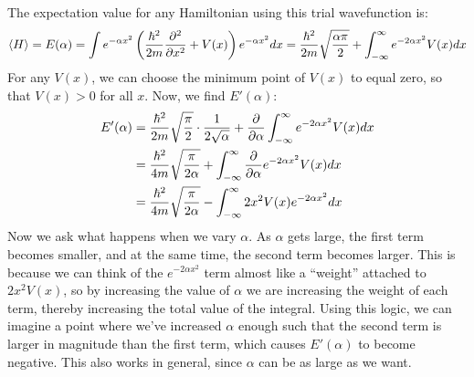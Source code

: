 \documentclass[10pt]{article}
\begin{document}
	\begin{solution}
		The expectation value for any Hamiltonian using this trial wavefunction is: 
		\[ \langle H \rangle = E(\alpha) = \int e^{-\alpha x^2}\left( \frac{\hbar^2}{2m}\pdv[2]{x} + V(x)\right) e^{-\alpha x^2} dx = \frac{\hbar^2}{2m}\sqrt{\frac{\alpha \pi}{2}} + \int_{-\infty}^\infty e^{-2\alpha x^2}V(x) dx\]
		For any $V(x)$, we can choose the minimum point of $V(x)$ to equal zero, so that $V(x) > 0$ for all $x$. Now, we find $E'(\alpha)$: 
		\begin{align*}
			E'(\alpha) &= \frac{\hbar^2}{2m} \sqrt{\frac \pi 2} \cdot \frac{1}{2\sqrt \alpha} + \pdv{\alpha} \int_{-\infty}^\infty e^{-2\alpha x^2}V(x) dx\\
			&= \frac{\hbar^2}{4m}\sqrt{\frac{\pi}{2\alpha}} + \int_{-\infty}^\infty \pdv{\alpha}e^{-2\alpha x^2} V(x) dx\\
			&= \frac{\hbar^2}{4m}\sqrt{\frac{\pi}{2\alpha}} - \int_{-\infty}^\infty 2x^2 V(x) e^{-2\alpha x^2} dx
		\end{align*}
		Now we ask what happens when we vary $\alpha$. As $\alpha$ gets large, the first term becomes smaller, and at the same time, the second term becomes larger. This is because we can think of the $e^{-2\alpha x^2}$ term almost like a ``weight'' attached to $2x^2V(x)$, so by increasing the value of $\alpha$ we are increasing the weight of each term, thereby increasing the total value of the integral. Using this logic, we can imagine a point where we've increased $\alpha$ enough such that the second term is larger in magnitude than the first term, which causes $E'(\alpha)$ to become negative. This also works in general, since $\alpha$ can be as large as we want. 
	\end{solution}
	
\end{document}
